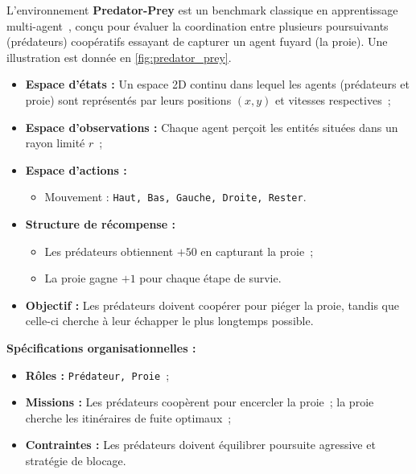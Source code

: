 L'environnement \textbf{Predator-Prey} est un benchmark classique en apprentissage multi-agent~\cite{lowe2017multi}, conçu pour évaluer la coordination entre plusieurs poursuivants (prédateurs) coopératifs essayant de capturer un agent fuyard (la proie). Une illustration est donnée en \autoref{fig:predator_prey}.

\begin{itemize}
    \item \textbf{Espace d'états :} Un espace 2D continu dans lequel les agents (prédateurs et proie) sont représentés par leurs positions $(x, y)$ et vitesses respectives~;
    \item \textbf{Espace d'observations :} Chaque agent perçoit les entités situées dans un rayon limité $r$~;
    \item \textbf{Espace d'actions :}
          \begin{itemize}
              \item Mouvement : \texttt{Haut, Bas, Gauche, Droite, Rester}.
          \end{itemize}
    \item \textbf{Structure de récompense :}
          \begin{itemize}
              \item Les prédateurs obtiennent $+50$ en capturant la proie~;
              \item La proie gagne $+1$ pour chaque étape de survie.
          \end{itemize}
    \item \textbf{Objectif :} Les prédateurs doivent coopérer pour piéger la proie, tandis que celle-ci cherche à leur échapper le plus longtemps possible.
\end{itemize}

\textbf{Spécifications organisationnelles :}
\begin{itemize}
    \item \textbf{Rôles :} \texttt{Prédateur, Proie}~;
    \item \textbf{Missions :} Les prédateurs coopèrent pour encercler la proie~; la proie cherche les itinéraires de fuite optimaux~;
    \item \textbf{Contraintes :} Les prédateurs doivent équilibrer poursuite agressive et stratégie de blocage.
\end{itemize}

